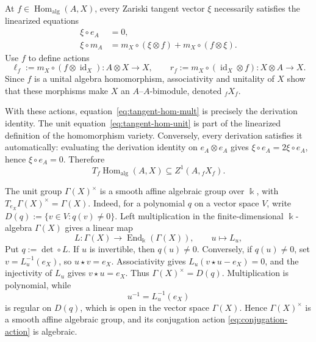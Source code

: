 \documentclass[11pt]{amsart}
\theoremstyle{definition}
\theoremstyle{remark}
\newcommand{\kk}{\Bbbk}
\DeclareMathOperator{\Hom}{Hom}
\DeclareMathOperator{\End}{End}
\DeclareMathOperator{\id}{id}
\begin{document}
At $f\in\Hom_{\mathrm{alg}}(A,X)$, every Zariski tangent vector $\xi$
necessarily satisfies the linearized equations
\begin{align}
  \xi\circ e_A&=0,\label{eq:tangent-hom-unit}\\
  \xi\circ m_A
  &=m_X\circ(\xi\otimes f)+m_X\circ(f\otimes\xi).
  \label{eq:tangent-hom-mult}
\end{align}
Use $f$ to define actions
\begin{equation}\label{eq:f-actions}
  \ell_f:=m_X\circ(f\otimes\id_X):A\otimes X\longrightarrow X,
  \qquad
  r_f:=m_X\circ(\id_X\otimes f):X\otimes A\longrightarrow X.
\end{equation}
Since $f$ is a unital algebra homomorphism, associativity and unitality of
$X$ show that these morphisms make $X$ an $A$--$A$-bimodule, denoted
${}_fX_f$.

With these actions, equation~\eqref{eq:tangent-hom-mult} is precisely the
derivation identity.  The unit equation~\eqref{eq:tangent-hom-unit} is part
of the linearized definition of the homomorphism variety.  Conversely, every
derivation satisfies it automatically: evaluating the derivation identity on
$e_A\otimes e_A$ gives
$\xi\circ e_A=2\xi\circ e_A$, hence $\xi\circ e_A=0$.  Therefore
\begin{equation}\label{eq:tangent-hom-z1}
  T_f\Hom_{\mathrm{alg}}(A,X)\subseteq Z^1(A,{}_fX_f).
\end{equation}

The unit group $\Gamma(X)^\times$ is a smooth affine algebraic group over
$\kk$, with $T_{e_X}\Gamma(X)^\times=\Gamma(X)$.
Indeed, for a polynomial $q$ on a vector space $V$, write
$D(q):=\{v\in V:q(v)\ne0\}$.  Left multiplication in the
finite-dimensional $\kk$-algebra $\Gamma(X)$ gives a linear map
\[
  L:\Gamma(X)\longrightarrow\End_{\kk}(\Gamma(X)),
  \qquad u\longmapsto L_u,
\]
Put $q:=\det\circ L$.  If $u$ is invertible, then $q(u)\ne0$.  Conversely,
if $q(u)\ne0$, set $v=L_u^{-1}(e_X)$, so $u\star v=e_X$.  Associativity gives
$L_u(v\star u-e_X)=0$, and the injectivity of $L_u$ gives
$v\star u=e_X$.  Thus $\Gamma(X)^\times=D(q)$.  Multiplication is
polynomial, while
\[
 u^{-1}=L_u^{-1}(e_X)
\]
is regular on $D(q)$, which is open in the vector space $\Gamma(X)$.
Hence $\Gamma(X)^\times$ is a smooth affine algebraic
group, and its conjugation action \eqref{eq:conjugation-action} is algebraic.
\end{document}

